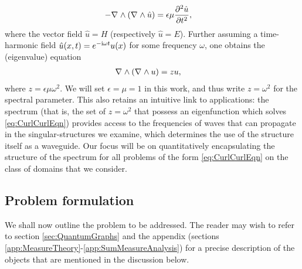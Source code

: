 \begin{align*}
	- \nabla_{}\wedge\left(  \nabla_{}\wedge \hat{u}  \right) &= \epsilon\mu\dfrac{\partial^2  \hat{u} }{\partial {t}^2},
\end{align*}
where the vector field $\hat{u} = H$ (respectively $\hat{u} = E$).
Further assuming a time-harmonic field $\hat{u}(x,t) = e^{-\mathrm{i}\omega t}u(x)$ for some frequency $\omega$, one obtains the (eigenvalue) equation
\begin{align} \label{eq:CurlCurlEqn}
	\nabla_{}\wedge\left(  \nabla_{}\wedge u  \right) &= zu,
\end{align}
where $z = \epsilon\mu\omega^2$.
We will set $\epsilon=\mu=1$ in this work, and thus write $z=\omega^2$ for the spectral parameter.
This also retains an intuitive link to applications: the spectrum (that is, the set of $z=\omega^2$ that possess an eigenfunction which solves \eqref{eq:CurlCurlEqn}) provides access to the frequencies of waves that can propagate in the singular-structures we examine, which determines the use of the structure itself as a waveguide.
Our focus will be on quantitatively encapsulating the structure of the spectrum for all problems of the form \eqref{eq:CurlCurlEqn} on the class of domains that we consider.

\subsection{Problem formulation} \label{ssec:OurSystem}
We shall now outline the problem to be addressed.
The reader may wish to refer to section \ref{sec:QuantumGraphs} and the appendix (sections \ref{app:MeasureTheory}-\ref{app:SumMeasureAnalysis}) for a precise description of the objects that are mentioned in the discussion below. 

